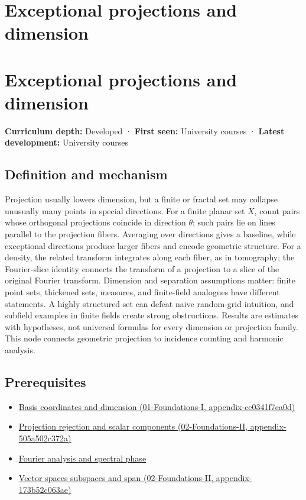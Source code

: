 \hypertarget{appendix-3c73f7862157}{}
\section*{Exceptional projections and dimension}
\section{Exceptional projections and dimension}\label{appendix-3c73f7862157-exceptional-projections-and-dimension}

\textbf{Curriculum depth:} Developed · \textbf{First seen:} University courses · \textbf{Latest development:} University courses

\subsection{Definition and mechanism}\label{appendix-3c73f7862157-definition-and-mechanism}

Projection usually lowers dimension, but a finite or fractal set may collapse unusually many points in special directions. For a finite planar set \(X\), count pairs whose orthogonal projections coincide in direction \(\theta\); such pairs lie on lines parallel to the projection fibers. Averaging over directions gives a baseline, while exceptional directions produce larger fibers and encode geometric structure. For a density, the related transform integrates along each fiber, as in tomography; the Fourier-slice identity connects the transform of a projection to a slice of the original Fourier transform. Dimension and separation assumptions matter: finite point sets, thickened sets, measures, and finite-field analogues have different statements. A highly structured set can defeat naive random-grid intuition, and subfield examples in finite fields create strong obstructions. Results are estimates with hypotheses, not universal formulas for every dimension or projection family. This node connects geometric projection to incidence counting and harmonic analysis.

\subsection{Prerequisites}\label{appendix-3c73f7862157-prerequisites}

\begin{itemize}
\tightlist
\item
  \href{../01-Foundations-I/main.pdf\#nameddest=appendix-ce0341f7ea0d}{Basis coordinates and dimension (01-Foundations-I, appendix-ce0341f7ea0d)}
\item
  \href{../02-Foundations-II/main.pdf\#nameddest=appendix-505a502c372a}{Projection rejection and scalar components (02-Foundations-II, appendix-505a502c372a)}
\item
  \hyperref[appendix-b60686ba06a1]{Fourier analysis and spectral phase}
\item
  \href{../02-Foundations-II/main.pdf\#nameddest=appendix-173b52c063ae}{Vector spaces subspaces and span (02-Foundations-II, appendix-173b52c063ae)}
\end{itemize}

